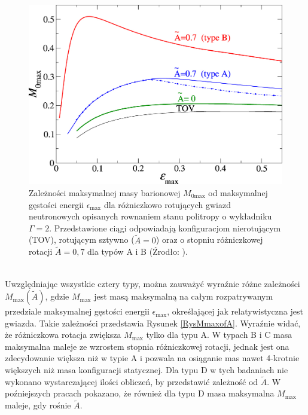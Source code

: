 \documentclass{bachelor_thesis}
\begin{document}
        \begin{figure}[h!]
            \centering
            \includegraphics[scale=1.35]{figures/RysMofE.jpg}
            \caption{Zależności maksymalnej masy barionowej $M_{0\textrm{max}}$ od maksymalnej gęstości energii $\epsilon_\textrm{max}$ dla różniczkowo rotujących gwiazd neutronowych opisanych rownaniem stanu politropy o wykładniku $\Gamma=2$. Przedstawione ciągi odpowiadają konfiguracjom nierotującym (TOV), rotującym sztywno ($\tilde{A}=0$) oraz o stopniu różniczkowej rotacji $\tilde{A}=0,7$ dla typów A i B (Źrodło: \citealp{Rosinska2017}).}
            \label{RysMofE}
        \end{figure}\\
        \indent Uwzględniając wszystkie cztery typy, można zauważyć wyraźnie różne zależności $M_\textrm{max}(\tilde{A})$, gdzie $M_\textrm{max}$ jest masą maksymalną na całym rozpatrywanym przedziale maksymalnej gęstości energii $\epsilon_\textrm{max}$, określającej jak relatywistyczna jest gwiazda. Takie zależności przedstawia Rysunek \ref{RysMmaxofA}. Wyraźnie widać, że różniczkowa rotacja zwiększa $M_\textrm{max}$ tylko dla typu A. W typach B i C masa maksymalna maleje ze wzrostem stopnia różniczkowej rotacji, jednak jest ona zdecydowanie większa niż w typie A i pozwala na osiąganie mas nawet 4-krotnie większych niż masa konfiguracji statycznej. Dla typu D w tych badaniach nie wykonano wystarczającej ilości obliczeń, by przedstawić zależność od $\tilde{A}$. W poźniejszych pracach pokazano, że również dla typu D masa maksymalna $M_\textrm{max}$ maleje, gdy rośnie $\tilde{A}$.
\end{document}
